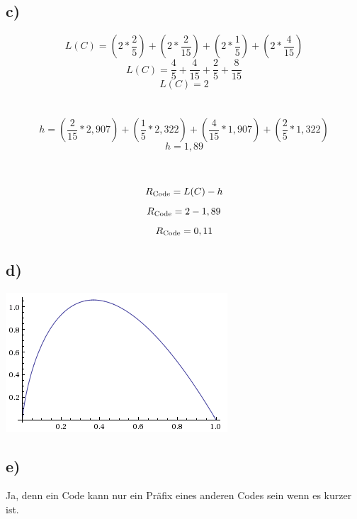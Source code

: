 \documentclass[a4paper,12pt]{scrartcl}
\begin{document}
\subsection{c)}
\begin{displaymath}
L(C) = (2*\frac{2} {5})+(2*\frac{2} {15})+(2*\frac{1} {5})+(2*\frac{4} {15})
\end{displaymath}
\begin{displaymath}
L(C) = \frac{4} {5} + \frac{4} {15} + \frac{2} {5} + \frac{8} {15}
\end{displaymath}
\begin{displaymath}
L(C) = 2
\end{displaymath}
\\\\
\begin{displaymath}
h = (\frac{2} {15}*2,907)+(\frac{1} {5}*2,322)+(\frac{4} {15}*1,907)+(\frac{2} {5}*1,322)
\end{displaymath}
\begin{displaymath}
h = 1,89
\end{displaymath}
\\\\
\begin{displaymath}
R\textsubscript{Code} = L(C) - h
\end{displaymath}
\begin{displaymath}
R\textsubscript{Code} = 2 - 1,89
\end{displaymath}
\begin{displaymath}
R\textsubscript{Code} = 0,11
\end{displaymath}

\subsection{d)}
\includegraphics{./images/Aufgabe6d}

\subsection{e)}
Ja, denn ein Code kann nur ein Präfix eines anderen Codes sein wenn es kurzer ist.
\end{document}

